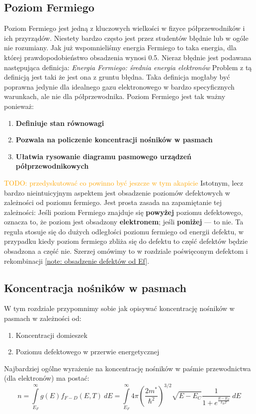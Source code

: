     \subsection{Poziom Fermiego}
        Poziom Fermiego jest jedną z kluczowych wielkości w fizyce półprzewodników i ich przyrządów. Niestety bardzo często jest przez studentów błędnie lub w ogóle nie rozumiany.
        Jak już wspomnieliśmy energia Fermiego to taka energia, dla której prawdopodobieństwo obsadzenia wynosi 0.5. Nieraz błędnie jest podawana następująca definicja: \textit{Energia Fermiego: średnia energia elektronów}
        Problem z tą definicją jest taki że jest ona z gruntu błędna. Taka definicja mogłaby być poprawna jedynie dla idealnego gazu elektronowego w bardzo specyficznych warunkach, ale nie dla półprzewodnika. Poziom Fermiego jest tak ważny ponieważ:
        \begin{enumerate}
            \item \textbf{Definiuje stan równowagi} 
            \item \textbf{Pozwala na policzenie koncentracji nośników w pasmach}
            \item \textbf{Ułatwia rysowanie diagramu pasmowego urządzeń półprzewodnikowych}
        \end{enumerate}
        \textcolor{orange}{TODO: przedyskutować co powinno być jeszcze w tym akapicie} \newline\newline
        \noindent Istotnym, lecz bardzo nieintuicyjnym aspektem jest obsadzenie poziomów defektowych w zależności od poziomu fermiego. Jest prosta zasada na zapamiętanie tej zależności:
        Jeśli poziom Fermiego znajduje się \textbf{powyżej} poziomu defektowego, oznacza to, że poziom jest obsadzony \textbf{elektronem}; jeśli \textbf{poniżej} — to nie. Ta reguła stosuje się do dużych odległości poziomu fermiego 
        od energii defektu, w przypadku kiedy poziom fermiego zbliża się do defektu to część defektów będzie obsadzona a część nie. Szerzej omówimy to w rozdziale poświęconym defektom i rekombinacji \ref{note: obsadzenie defektów od Ef}. 

    \subsection{Koncentracja nośników w pasmach}
        W tym rozdziale przypomnimy sobie jak opisywać koncentrację nośników w pasmach w zależności od: 
        \begin{enumerate}
            \item Koncentracji domieszek
            \item Poziomu defektowego w przerwie energetycznej
        \end{enumerate}
        Najbardziej ogólne wyrażenie na koncentrację nośników w paśmie przewodnictwa (dla elektronów) ma postać:
        \begin{equation}
            n = \int \limits_{E_F}^{\infty} g(E)f_{F-D}(E,T)\:dE = 
            \int \limits_{E_F}^{\infty} 4\pi\left(\frac{2m^*}{\hbar^2}\right)^{3/2}\sqrt{E - E_C}\frac{1}{1+e^{\frac{E - E_F}{k_BT}}} \: dE
        \end{equation}
